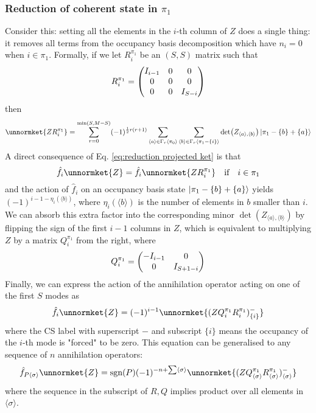 \documentclass[12pt]{article}
\newcommand{\sgn}{\text{sgn}}
\newcommand{\seq}[1]{\langle #1\rangle}
\begin{document}
	\subsubsection{Reduction of coherent state in $\pi_1$} \label{sec: reduction in pi 1}
	Consider this: setting all the elements in the $i$-th column of $Z$ does a single thing: it removes all terms from the occupancy basis decomposition which have $n_i=0$ when $i\in\pi_1$. Formally, if we let $R^{\pi_1}_i$ be an $(S,S)$ matrix such that
	\begin{equation}\label{eq:reduction projection}
	R^{\pi_1}_i=\mqty(\dmat[0]{I_{i-1}, 0, I_{S-i}})
	\end{equation}
	then
	\begin{equation} \label{eq:reduction projected ket}
	\unnormket{ZR^{\pi_1}_i}=\sum_{r=0}^{\min(S,M-S)}(-1)^{\frac{1}{2}r(r+1)}\sum_{\seq{a}\in\Gamma_r\seq{\pi_0}}\sum_{\seq{b}\in\Gamma_r\seq{\pi_1-\{i\}}}\det(Z_{\seq{a},\seq{b}})\ket{\pi_1-\{b\}+\{a\}}
	\end{equation}
	A direct consequence of Eq. \ref{eq:reduction projected ket} is that
	\begin{equation}
	\hat{f}_i\unnormket{Z}=\hat{f}_i\unnormket{ZR^{\pi_1}_i}\qq{if}i\in\pi_1
	\end{equation}
	and the action of $\hat{f}_i$ on an occupancy basis state $\ket{\pi_1-\{b\}+\{a\}}$ yields $(-1)^{i-1-\eta_i(\seq{b})}$, where $\eta_i(\seq{b})$ is the number of elements in $b$ smaller than $i$. We can absorb this extra factor into the corresponding minor $\det(Z_{\seq{a},\seq{b}})$ by flipping the sign of the first $i-1$ columns in $Z$, which is equivalent to multiplying $Z$ by a matrix $Q^{\pi_1}_i$ from the right, where
	\begin{equation}
	Q^{\pi_1}_i = \mqty(\dmat[0]{-I_{i-1},I_{S+1-i}})
	\end{equation}
	Finally, we can express the action of the annihilation operator acting on one of the first $S$ modes as
	\begin{equation}
	\hat{f}_i\unnormket{Z}=(-1)^{i-1}\unnormket{(ZQ^{\pi_1}_iR^{\pi_1}_i)^-_{\{i\}}}
	\end{equation}
	where the CS label with superscript $-$ and subscript $\{i\}$ means the occupancy of the $i$-th mode is "forced" to be zero. This equation can be generalised to any sequence of $n$ annihilation operators:
	\begin{equation} \label{eq:effect of pi_1 lowering operator}
	\hat{f}_{P\seq{\sigma}}\unnormket{Z}=\sgn(P)(-1)^{-n+\sum\seq{\sigma}}\unnormket{(ZQ^{\pi_1}_{\seq{\sigma}}R^{\pi_1}_{\seq{\sigma}})^{-}_{\seq{\sigma}}}
	\end{equation}
	where the sequence in the subscript of $R, Q$ implies product over all elements in $\seq{\sigma}$.
	
\end{document}
